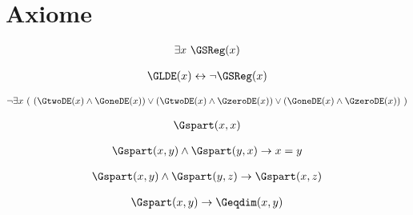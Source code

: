 \section{Axiome}


\begin{erin}
    \begin{align*}
        \exists x\ \GSReg(x)
    \end{align*}
\end{erin}

\begin{erin}
    \begin{align*}
        \GLDE(x) \leftrightarrow \neg\GSReg(x)
    \end{align*}
\end{erin}
                
\begin{erin}
    \begin{align*}
        \neg\exists x\ (\ (\GtwoDE(x) \wedge \GoneDE(x)) \vee (\GtwoDE(x) \wedge \GzeroDE(x)) \vee (\GoneDE(x) \wedge \GzeroDE(x))\ )
    \end{align*}
\end{erin}

\begin{erin}
    \begin{align*}
        \Gspart(x,x)
    \end{align*}
\end{erin}

\begin{erin}
    \begin{align*}
        \Gspart(x,y) \wedge \Gspart(y,x) \to x=y
    \end{align*}
\end{erin}

\begin{erin}
    \begin{align*}
        \Gspart(x,y) \wedge \Gspart(y,z) \to \Gspart(x,z)
    \end{align*}
\end{erin}
             
\begin{erin}
    \begin{align*}
        \Gspart(x,y) \to \Geqdim(x,y)
    \end{align*}
\end{erin}

